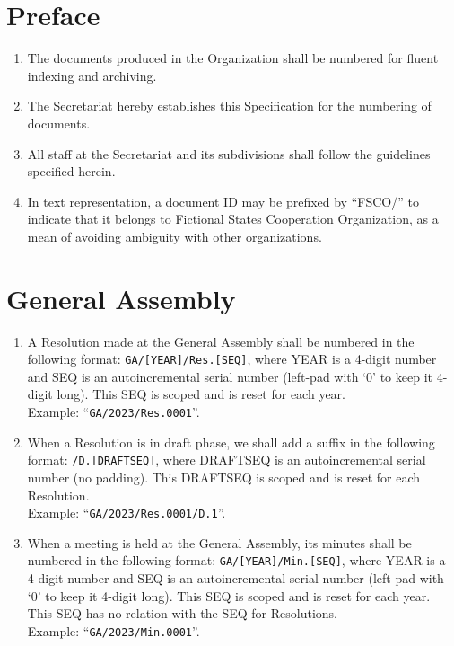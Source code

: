 



\section{Preface}
\begin{enumerate}
	\item The documents produced in the Organization shall be numbered for fluent indexing and archiving.
	\item The Secretariat hereby establishes this Specification for the numbering of documents.
	\item All staff at the Secretariat and its subdivisions shall follow the guidelines specified herein.
	\item In text representation, a document ID may be prefixed by ``FSCO/''
	      to indicate that it belongs to Fictional States Cooperation Organization,
	      as a mean of avoiding ambiguity with other organizations.
\end{enumerate}

\section{General Assembly}
\begin{enumerate}
	\item A Resolution made at the General Assembly shall be numbered in the following format:
	      \texttt{GA/[YEAR]/Res.[SEQ]}, where YEAR is a 4-digit number and SEQ is an autoincremental serial number
	      (left-pad with `0' to keep it 4-digit long).
          This SEQ is scoped and is reset for each year.\\
	      Example: ``\texttt{GA/2023/Res.0001}''.
	\item When a Resolution is in draft phase, we shall add a suffix in the following format: \texttt{/D.[DRAFTSEQ]},
	      where DRAFTSEQ is an autoincremental serial number (no padding).
          This DRAFTSEQ is scoped and is reset for each Resolution.\\
	      Example: ``\texttt{GA/2023/Res.0001/D.1}''.
	\item When a meeting is held at the General Assembly, its minutes shall be numbered in the following format:
	      \texttt{GA/[YEAR]/Min.[SEQ]}, where YEAR is a 4-digit number and SEQ is an autoincremental serial number
	      (left-pad with `0' to keep it 4-digit long).
          This SEQ is scoped and is reset for each year.
	      This SEQ has no relation with the SEQ for Resolutions.\\
	      Example: ``\texttt{GA/2023/Min.0001}''.
\end{enumerate}



